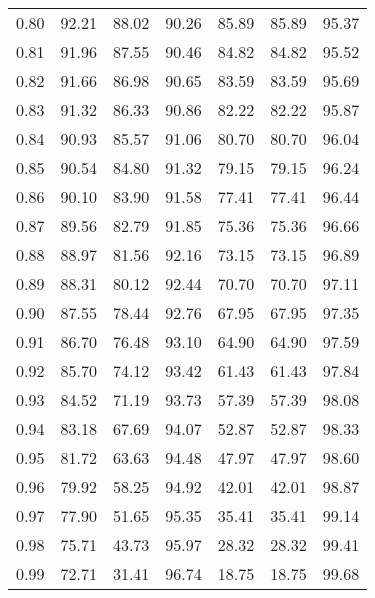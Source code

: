 \begin{tabular}{|c|c|c|c|c|c|c|}
      0.80 &     92.21 &     88.02 &      90.26 &   85.89 &      85.89 &         95.37 \\
      0.81 &     91.96 &     87.55 &      90.46 &   84.82 &      84.82 &         95.52 \\
      0.82 &     91.66 &     86.98 &      90.65 &   83.59 &      83.59 &         95.69 \\
      0.83 &     91.32 &     86.33 &      90.86 &   82.22 &      82.22 &         95.87 \\
      0.84 &     90.93 &     85.57 &      91.06 &   80.70 &      80.70 &         96.04 \\
      0.85 &     90.54 &     84.80 &      91.32 &   79.15 &      79.15 &         96.24 \\
      0.86 &     90.10 &     83.90 &      91.58 &   77.41 &      77.41 &         96.44 \\
      0.87 &     89.56 &     82.79 &      91.85 &   75.36 &      75.36 &         96.66 \\
      0.88 &     88.97 &     81.56 &      92.16 &   73.15 &      73.15 &         96.89 \\
      0.89 &     88.31 &     80.12 &      92.44 &   70.70 &      70.70 &         97.11 \\
      0.90 &     87.55 &     78.44 &      92.76 &   67.95 &      67.95 &         97.35 \\
      0.91 &     86.70 &     76.48 &      93.10 &   64.90 &      64.90 &         97.59 \\
      0.92 &     85.70 &     74.12 &      93.42 &   61.43 &      61.43 &         97.84 \\
      0.93 &     84.52 &     71.19 &      93.73 &   57.39 &      57.39 &         98.08 \\
      0.94 &     83.18 &     67.69 &      94.07 &   52.87 &      52.87 &         98.33 \\
      0.95 &     81.72 &     63.63 &      94.48 &   47.97 &      47.97 &         98.60 \\
      0.96 &     79.92 &     58.25 &      94.92 &   42.01 &      42.01 &         98.87 \\
      0.97 &     77.90 &     51.65 &      95.35 &   35.41 &      35.41 &         99.14 \\
      0.98 &     75.71 &     43.73 &      95.97 &   28.32 &      28.32 &         99.41 \\
      0.99 &     72.71 &     31.41 &      96.74 &   18.75 &      18.75 &         99.68 \\
\bottomrule
\end{tabular}
